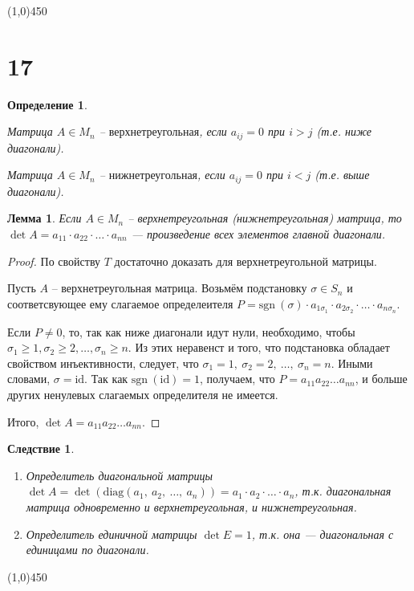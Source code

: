 \documentclass[a4paper,12pt]{article}
\newcommand{\id}{\mathrm{id}}
\newcommand{\diag}{\mathrm{diag}}
\newcommand{\sgn}{\mathrm{sgn\:}}
\newtheorem*{definition}{Определение}
\newtheorem*{consequence}{Следствие}
\newtheorem*{lemma}{Лемма}
\begin{document}
	\begin{center}
		\line(1,0){450}
	\end{center}
	\section*{17}
	\begin{definition}
		\ 
		
		Матрица $A \in  M_n$ – $\textbf{верхнетреугольная}$, если
		$a_{ij} = 0$  при  $i > j$  (т.е. ниже диагонали).
		
		Матрица $A \in  M_n$ – $\textbf{нижнетреугольная}$, если
		$a_{ij} = 0$  при  $i < j$  (т.е. выше диагонали).
	\end{definition}
	\begin{lemma}
		Если  $A \in  M_n$ – верхнетреугольная (нижнетреугольная) матрица, то $\det A = a_{11} \cdot a_{22} \cdot \ldots \cdot a_{nn}$ --- произведение всех элементов главной диагонали.
	\end{lemma}
	\begin{proof}
		По свойству $T$ достаточно доказать для верхнетреугольной матрицы.
		
		Пусть $A$ – верхнетреугольная матрица. Возьмём подстановку $\sigma \in S_n$ и соответсвующее ему слагаемое определеителя $P = \sgn(\sigma) \cdot a_{1\sigma_1} \cdot a_{2\sigma_2} \cdot \ldots \cdot a_{n\sigma_n}.$
		
		Если $P \neq 0$, то, так как ниже диагонали идут нули, необходимо, чтобы\\ $\sigma_1 \geq 1, \sigma_2 \geq 2, \ldots , \sigma_n \geq n$. Из этих неравенст и того, что подстановка обладает свойством инъективности, следует, что $\sigma_1 = 1,\ \sigma_2 = 2 ,\ \ldots ,\ \sigma_n = n$. Иными словами,
		$\sigma  =\id$. Так как $\sgn (\id) = 1$, получаем, что $P = a_{11} a_{22} \ldots a_{nn}$, и больше других ненулевых слагаемых определителя не имеется.
		
		Итого, $\det A = a_{11} a_{22} \ldots a_{nn}$.
	\end{proof}
	\begin{consequence}
		\ 
		
		\begin{enumerate}
			\item Определитель диагональной матрицы $\det A = \det (\diag (a_1,\ a_2,\ \ldots ,\ a_n)) = a_1 \cdot a_2 \cdot \ldots \cdot a_n$, т.к. диагональная матрица одновременно и верхнетреугольная, и нижнетреугольная. 
			\item Определитель единичной матрицы  $\det E = 1$, т.к. она --- диагональная с единицами по диагонали.
		\end{enumerate}
	\end{consequence}
	\begin{center}
		\line(1,0){450}
	\end{center}
\end{document}
